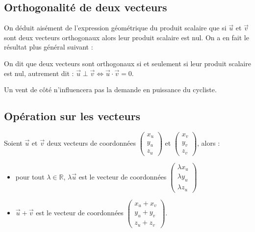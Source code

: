 \documentclass[letterpaper,10pt,english]{jupyterBook}
\begin{document}
\subsection{Orthogonalité de deux vecteurs}
\label{\detokenize{Part1/Cours:orthogonalite-de-deux-vecteurs}}
\sphinxAtStartPar
On déduit aisément de l’expression géométrique du produit scalaire que si \(\vec{u}\) et \(\vec{v}\) sont deux vecteurs orthogonaux alors leur produit scalaire est nul. On a en fait le résultat plus général suivant :

\sphinxAtStartPar
{} On dit que deux vecteurs sont orthogonaux si et seulement si leur produit scalaire est nul, autrement dit :
\(\vec{u} \perp \vec{v} \Leftrightarrow \vec{u} \cdot \vec{v} =0.\)

\sphinxAtStartPar
{} Un vent de côté n’influencera pas la demande en puissance du cycliste.


\subsection{Opération sur les vecteurs}
\label{\detokenize{Part1/Cours:operation-sur-les-vecteurs}}
\sphinxAtStartPar
Soient \(\vec{u}\) et \(\vec{v}\) deux vecteurs de coordonnées \(\begin{pmatrix} x_u \\ y_u \\ z_u \end{pmatrix}\) et \(\begin{pmatrix} x_v \\ y_v \\ z_v \end{pmatrix}\), alors :
\begin{itemize}
\item {} 
\sphinxAtStartPar
pour tout \(\lambda \in \mathbb{R}\), \(\lambda\vec{u}\) est le vecteur de coordonnées \(\begin{pmatrix} \lambda x_u \\ \lambda y_u \\ \lambda z_u\end{pmatrix}\)

\item {} 
\sphinxAtStartPar
\(\vec{u}+\vec{v}\) est le vecteur de coordonnées \(\begin{pmatrix} x_u+x_v\\y_u+y_v\\z_u+z_v \end{pmatrix}\).

\end{itemize}
\end{document}
